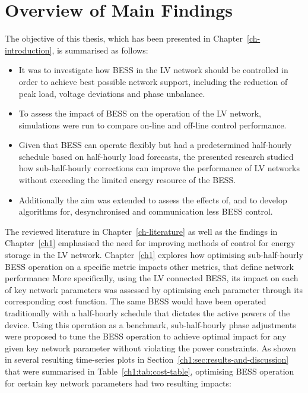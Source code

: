 \section{Overview of Main Findings}
\label{ch-conclusions:sec:main-findings}

The objective of this thesis, which has been presented in Chapter~\ref{ch-introduction}, is summarised as follows:

\begin{itemize}
	\item
	It was to investigate how BESS in the LV network should be controlled in order to achieve best possible network support, including the reduction of peak load, voltage deviations and phase unbalance.
	\item 
	To assess the impact of BESS on the operation of the LV network, simulations were run to compare on-line and off-line control performance.
	\item
	Given that BESS can operate flexibly but had a predetermined half-hourly schedule based on half-hourly load forecasts, the presented research studied how sub-half-hourly corrections can improve the performance of LV networks without exceeding the limited energy resource of the BESS.
	\item
	Additionally the aim was extended to assess the effects of, and to develop algorithms for, desynchronised and communication less BESS control.
\end{itemize}

The reviewed literature in Chapter~\ref{ch-literature} as well as the findings in Chapter~\ref{ch1} emphasised the need for improving methods of control for energy storage in the LV network.
Chapter~\ref{ch1} explores how optimising sub-half-hourly BESS operation on a specific metric impacts other metrics, that define network performance
More specifically, using the LV connected BESS, its impact on each of key network parameters was assessed by optimising each parameter through its corresponding cost function.
The same BESS would have been operated traditionally with a half-hourly schedule that dictates the active powers of the device.
Using this operation as a benchmark, sub-half-hourly phase adjustments were proposed to tune the BESS operation to achieve optimal impact for any given key network parameter without violating the power constraints.
As shown in several resulting time-series plots in Section~\ref{ch1:sec:results-and-discussion} that were summarised in Table~\ref{ch1:tab:cost-table}, optimising BESS operation for certain key network parameters had two resulting impacts:

